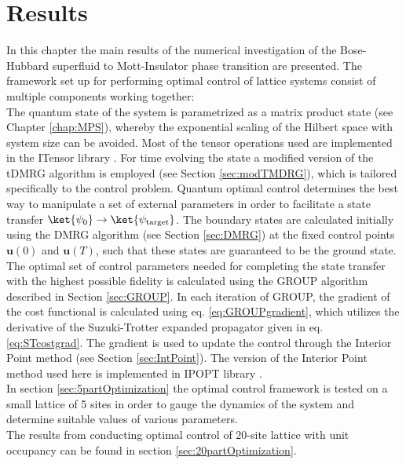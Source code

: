 \chapter{Results}

In this chapter the main results of the numerical investigation of the Bose-Hubbard superfluid to Mott-Insulator phase transition are presented. The framework set up for performing optimal control of lattice systems consist of multiple components working together:\\
The quantum state of the system is parametrized as a matrix product state (see Chapter \ref{chap:MPS}), whereby the exponential scaling of the Hilbert space with system size can be avoided. Most of the tensor operations used are implemented in the ITensor library \cite{ITensor}. For time evolving the state a modified version of the tDMRG algorithm is employed (see Section \ref{sec:modTMDRG}), which is tailored specifically to the control problem.
Quantum optimal control determines the best way to manipulate a set of external parameters in order to facilitate a state transfer $\ket{\psi_0} \to \ket{\psi_{\mathrm{target}}}$. The boundary states are calculated initially using the DMRG algorithm (see Section \ref{sec:DMRG}) at the fixed control points $\boldsymbol{u}(0)$ and $\boldsymbol{u}(T)$, such that these states are guaranteed to be the ground state.
The optimal set of control parameters needed for completing the state transfer with the highest possible fidelity is calculated using the GROUP algorithm described in Section \ref{sec:GROUP}. In each iteration of GROUP, the gradient of the cost functional is calculated using eq. \eqref{eq:GROUPgradient}, which utilizes the derivative of the Suzuki-Trotter expanded propagator given in eq. \eqref{eq:STcostgrad}. The gradient is used to update the control through the Interior Point method (see Section \ref{sec:IntPoint}). The version of the Interior Point method used here is implemented in IPOPT library \cite{Wachter2006}.\\

In section \ref{sec:5partOptimization} the optimal control framework is tested on a small lattice of 5 sites in order to gauge the dynamics of the system and determine suitable values of various parameters.\\
The results from conducting optimal control of 20-site lattice with unit occupancy can be found in section \ref{sec:20partOptimization}. 



